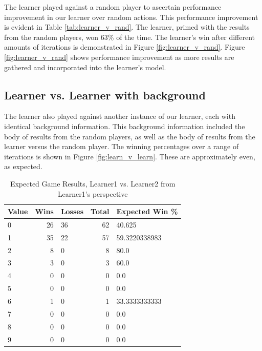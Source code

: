 \documentclass[12pt,pdftex]{article}
\begin{document}
The learner played against a random player to ascertain performance improvement in our learner over random actions. 
This performance improvement is evident in Table \ref{tab:learner_v_rand}. 
The learner, primed with the results from the random players, won 63\% of the time.  
The learner's win after different amounts of iterations is demonstrated in Figure \ref{fig:learner_v_rand}.
Figure \ref{fig:learner_v_rand} shows performance improvement as more results are gathered and incorporated into the learner's model.

\subsection{Learner vs. Learner with background}
The learner also played against another instance of our learner, each with identical background information.
This background information included the body of results from the random players, as well as the body of results from the learner versus the random player. 
The winning percentages over a range of iterations is shown in Figure \ref{fig:learn_v_learn}.
These are approximately even, as expected. 

\begin{table}[hb!]
\centering
\begin{tabular}{| l | r | l | r | l |}
	\hline
 \textbf{Value} & \textbf{Wins}& \textbf{Losses}& \textbf{Total}& \textbf{Expected Win \%}\\
\hline
0& 26& 36& 62& 40.625\\
1& 35& 22& 57& 59.3220338983\\
2& 8& 0& 8& 80.0\\
3& 3& 0& 3& 60.0\\
4& 0& 0& 0& 0.0\\
5& 0& 0& 0& 0.0\\
6& 1& 0& 1& 33.3333333333\\
7& 0& 0& 0& 0.0\\
8& 0& 0& 0& 0.0\\
9& 0& 0& 0& 0.0\\
\hline
\end{tabular}
\caption{Expected Game Results, Learner1 vs. Learner2 from Learner1's perspective}
\label{tab:learner1_v_learner}
\end{table}
\end{document}
